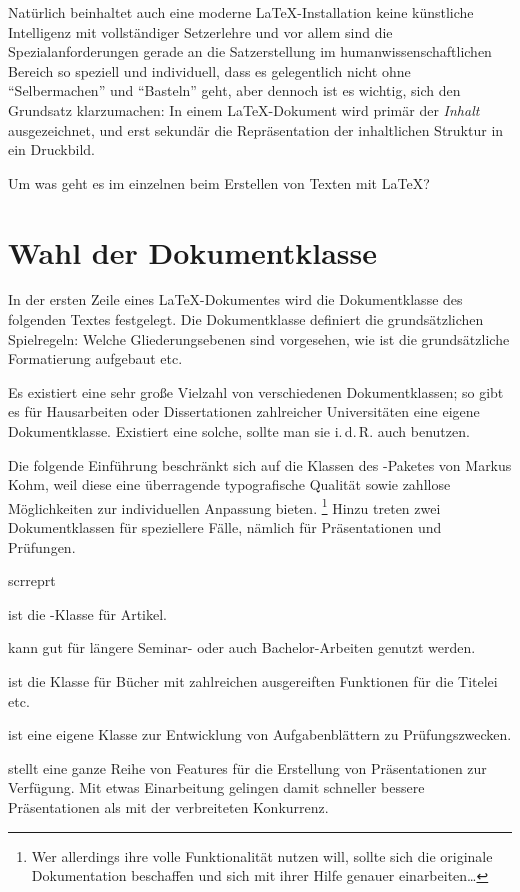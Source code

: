 Natürlich beinhaltet auch eine moderne \LaTeX -Installation keine künstliche Intelligenz mit 
vollständiger Setzerlehre und vor allem sind die Spezialanforderungen gerade an die Satzerstellung im
humanwissenschaftlichen Bereich so speziell und individuell, dass es gelegentlich nicht ohne 
\enquote{Selbermachen} und \enquote{Basteln} geht, aber dennoch ist es wichtig, sich den Grundsatz
klarzumachen: In einem \LaTeX -Dokument wird primär der \emph{Inhalt} ausgezeichnet, und erst sekundär
die Repräsentation der inhaltlichen Struktur in ein Druckbild.

Um was geht es im einzelnen beim Erstellen von Texten mit \LaTeX ? 


\section{Wahl der Dokumentklasse}

In der ersten Zeile eines \LaTeX -Dokumentes wird die Dokumentklasse des folgenden Textes 
festgelegt. Die Dokumentklasse definiert die grundsätzlichen Spielregeln:
Welche Gliederungsebenen sind vorgesehen, wie ist die grundsätzliche Formatierung aufgebaut etc.

Es existiert eine sehr große Vielzahl von verschiedenen Dokumentklassen;
so gibt es für Hausarbeiten oder Dissertationen zahlreicher Universitäten eine eigene
Dokumentklasse. Existiert eine solche, sollte man sie i.\,d.\,R. auch benutzen.

Die folgende Einführung beschränkt sich auf die Klassen des \KOMAScript-Paketes von
Markus Kohm, weil diese eine überragende typografische Qualität sowie zahllose Möglichkeiten
zur individuellen Anpassung bieten.%
\footnote{Wer allerdings ihre volle Funktionalität nutzen will, sollte sich die originale 
Dokumentation beschaffen und sich mit ihrer Hilfe genauer einarbeiten\dots}
Hinzu treten zwei Dokumentklassen für speziellere Fälle, nämlich für Präsentationen und 
Prüfungen.

\begin{labeling}{scrreprt}
 \item[scrartcl] ist die \KOMAScript-Klasse für Artikel.
 \item[scrreprt] kann gut für längere Seminar- oder auch Bachelor-Arbeiten genutzt werden.
 \item[scrbook] ist die Klasse für Bücher mit zahlreichen ausgereiften Funktionen für
  die Titelei etc.
 \item[exam] ist eine eigene Klasse zur Entwicklung von Aufgabenblättern zu Prüfungszwecken.
 \item[beamer] stellt eine ganze Reihe von Features für die Erstellung von Präsentationen
  zur Verfügung. Mit etwas Einarbeitung gelingen damit schneller bessere Präsentationen als 
  mit der verbreiteten Konkurrenz.
\end{labeling}



